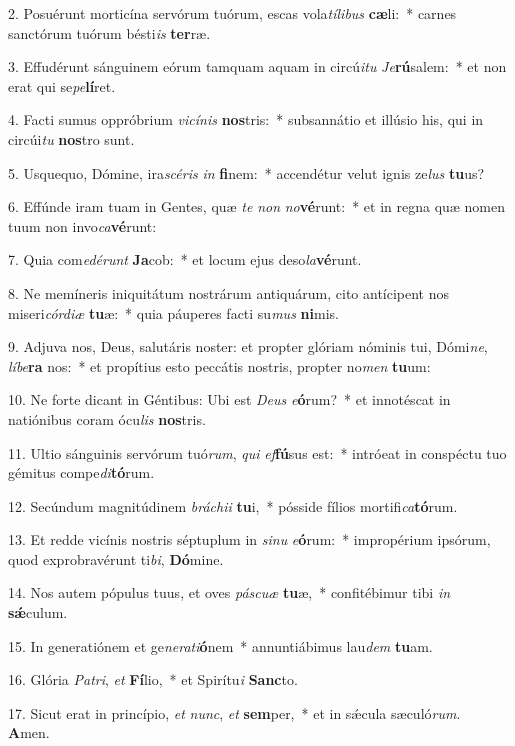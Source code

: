2. Posuérunt morticína servórum tuórum, escas vola\textit{tí}\textit{li}\textit{bus} \textbf{cæ}li:~*  carnes sanctórum tuórum bésti\textit{is} \textbf{ter}ræ.\

3. Effudérunt sánguinem eórum tamquam aquam in circú\textit{i}\textit{tu} \textit{Je}\textbf{rú}salem:~*  et non erat qui se\textit{pe}\textbf{lí}ret.\

4. Facti sumus oppróbrium \textit{vi}\textit{cí}\textit{nis} \textbf{nos}tris:~*  subsannátio et illúsio his, qui in circúi\textit{tu} \textbf{nos}tro sunt.\

5. Usquequo, Dómine, ira\textit{scé}\textit{ris} \textit{in} \textbf{fi}nem:~*  accendétur velut ignis ze\textit{lus} \textbf{tu}us?\

6. Effúnde iram tuam in Gentes, quæ \textit{te} \textit{non} \textit{no}\textbf{vé}runt:~*  et in regna quæ nomen tuum non invo\textit{ca}\textbf{vé}runt:\

7. Quia com\textit{e}\textit{dé}\textit{runt} \textbf{Ja}cob:~*  et locum ejus deso\textit{la}\textbf{vé}runt.\

8. Ne memíneris iniquitátum nostrárum antiquárum, cito antícipent nos miseri\textit{cór}\textit{di}\textit{æ} \textbf{tu}æ:~*  quia páuperes facti su\textit{mus} \textbf{ni}mis.\

9. Adjuva nos, Deus, salutáris noster: et propter glóriam nóminis tui, Dómi\textit{ne}, \textit{lí}\textit{be}\textbf{ra} nos:~*  et propítius esto peccátis nostris, propter no\textit{men} \textbf{tu}um:\

10. Ne forte dicant in Géntibus: Ubi est \textit{De}\textit{us} \textit{e}\textbf{ó}rum?~*  et innotéscat in natiónibus coram ócu\textit{lis} \textbf{nos}tris.\

11. Ultio sánguinis servórum tuó\textit{rum}, \textit{qui} \textit{ef}\textbf{fú}sus est:~*  intróeat in conspéctu tuo gémitus compe\textit{di}\textbf{tó}rum.\

12. Secúndum magnitúdinem \textit{brá}\textit{chi}\textit{i} \textbf{tu}i,~*  pósside fílios mortifi\textit{ca}\textbf{tó}rum.\

13. Et redde vicínis nostris séptuplum in \textit{si}\textit{nu} \textit{e}\textbf{ó}rum:~*  impropérium ipsórum, quod exprobravérunt ti\textit{bi}, \textbf{Dó}mine.\

14. Nos autem pópulus tuus, et oves \textit{pás}\textit{cu}\textit{æ} \textbf{tu}æ,~*  confitébimur tibi \textit{in} \textbf{sǽ}culum.\

15. In generatiónem et ge\textit{ne}\textit{ra}\textit{ti}\textbf{ó}nem~*  annuntiábimus lau\textit{dem} \textbf{tu}am.\

16. Glória \textit{Pa}\textit{tri}, \textit{et} \textbf{Fí}lio,~*  et Spirítu\textit{i} \textbf{Sanc}to.\

17. Sicut erat in princípio, \textit{et} \textit{nunc}, \textit{et} \textbf{sem}per,~*  et in sǽcula sæculó\textit{rum}. \textbf{A}men.\

